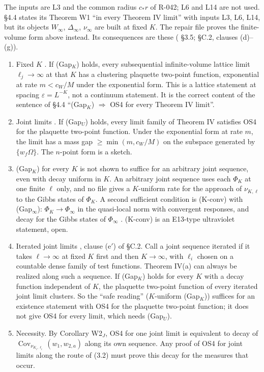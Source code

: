 The inputs are L3 and the common radius $c_*r$ of R-042; L6 and L14 are not used.  \S4.4 states its Theorem W1 ``in every Theorem IV limit'' with inputs L3, L6, L14, but its objects $W_\infty$, $\Delta_\infty$, $\nu_\infty$ are built at fixed $K$. The repair file proves the finite-volume form above instead. Its consequences are these ( \S3.5;  \S C.2, clauses (d)--(g)).
\begin{enumerate}
\item Fixed $K$ . If (Gap$_K$) holds, every subsequential infinite-volume lattice limit $\ell_j\to\infty$ at that $K$ has a clustering plaquette two-point function, exponential at rate $m<c_W/M$ under the exponential form. This is a lattice statement at spacing $\varepsilon=L^{-K}$, not a continuum statement. It is the correct content of the sentence of  \S4.4 ``(Gap$_K$) $\Rightarrow$ OS4 for every Theorem IV limit''.
\item Joint limits . If (Gap$_U$) holds, every limit family of Theorem IV satisfies OS4 for the plaquette two-point function. Under the exponential form at rate $m$, the limit has a mass gap $\ge\min(m,c_W/M)$ on the subspace generated by $\{w_f\Omega\}$. The $n$-point form is a sketch.
\item (Gap$_K$) for every $K$ is not shown to suffice for an arbitrary joint sequence, even with decay uniform in $K$. An arbitrary joint sequence uses each $\Phi_K$ at one finite $\ell$ only, and no file gives a $K$-uniform rate for the approach of $\nu_{K,\ell}$ to the Gibbs states of $\Phi_K$. A second sufficient condition is (K-conv) with (Gap$_\infty$): $\Phi_K\to\Phi_\infty$ in the quasi-local norm with convergent responses, and decay for the Gibbs states of $\Phi_\infty$ . (K-conv) is an E13-type ultraviolet statement, open.
\item Iterated joint limits , clause (e$'$) of  \S C.2. Call a joint sequence iterated if it takes $\ell\to\infty$ at fixed $K$ first and then $K\to\infty$, with $\ell_i$ chosen on a countable dense family of test functions. Theorem IV(a) can always be realized along such a sequence. If (Gap$_K$) holds for every $K$ with a decay function independent of $K$, the plaquette two-point function of every iterated joint limit clusters. So the ``safe reading'' ($K$-uniform (Gap$_K$)) suffices for an existence statement with OS4 for the plaquette two-point function; it does not give OS4 for every limit, which needs (Gap$_U$).
\item Necessity. By Corollary W2$_J$, OS4 for one joint limit is equivalent to decay of $\operatorname{Cov}_{\nu_{K_i,\ell_i}}(w_1,w_{2,a})$ along its own sequence. Any proof of OS4 for joint limits along the route of  (3.2) must prove this decay for the measures that occur.
\end{enumerate}
